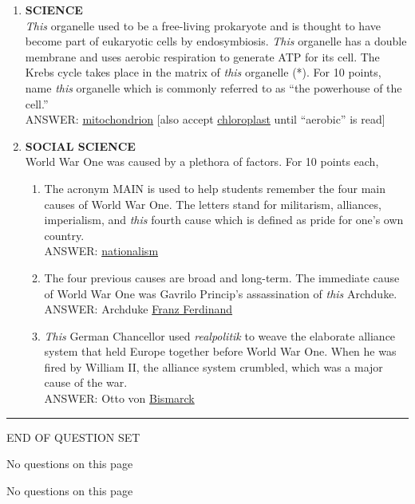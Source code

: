 \documentclass{report}
\newcommand*{\backtrack}{\setcounter{enumi}{\numexpr\theenumi-1\relax}}
\begin{document}
\begin{enumerate}
    \item \textbf{SCIENCE} \\ \textit{This} organelle used to be a free-living prokaryote and is thought to have become part of eukaryotic cells by endosymbiosis. \textit{This} organelle has a double membrane and uses aerobic respiration to generate ATP for its cell. The Krebs cycle takes place in the matrix of \textit{this} organelle (*). For 10 points, name \textit{this} organelle which is commonly referred to as ``the powerhouse of the cell.'' \\ ANSWER: \underline{mitochondrion} [also accept \underline{chloroplast} until ``aerobic'' is read] \backtrack
    \item \textbf{SOCIAL SCIENCE} \\ World War One was caused by a plethora of factors. For 10 points each,
    \begin{enumerate}[label=\Alph*]
        \item The acronym MAIN is used to help students remember the four main causes of World War One. The letters stand for militarism, alliances, imperialism, and \textit{this} fourth cause which is defined as pride for one's own country. \\ ANSWER: \underline{nationalism}
        \item The four previous causes are broad and long-term. The immediate cause of World War One was Gavrilo Princip's assassination of \textit{this} Archduke. \\ ANSWER: Archduke \underline{Franz Ferdinand}
        \item \textit{This} German Chancellor used \textit{realpolitik} to weave the elaborate alliance system that held Europe together before World War One. When he was fired by William II, the alliance system crumbled, which was a major cause of the war. \\ ANSWER: Otto von \underline{Bismarck}
    \end{enumerate}
\end{enumerate}

\vspace*{0.5 cm}
\centering
\rule{10 cm}{0.4pt}

\Large
END OF QUESTION SET
\newpage

\vspace*{\fill}
\centering
\thispagestyle{empty}
\Large
No questions on this page
\vspace*{\fill}

\newpage

\vspace*{\fill}
\centering
\thispagestyle{empty}
\Large
No questions on this page
\vspace*{\fill}
\end{document}
